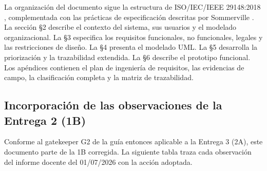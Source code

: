 \documentclass[11pt,a4paper]{article}
\begin{document}
La organización del documento sigue la estructura de ISO/IEC/IEEE 29148:2018 \cite{iso29148},
complementada con las prácticas de especificación descritas por Sommerville \cite{sommerville2016}.
La sección §2 describe el contexto del sistema, sus usuarios y el modelado organizacional. La §3
especifica los requisitos funcionales, no funcionales, legales y las restricciones de diseño. La §4
presenta el modelado UML. La §5 desarrolla la priorización y la trazabilidad extendida. La §6
describe el prototipo funcional. Los apéndices contienen el plan de ingeniería de requisitos, las
evidencias de campo, la clasificación completa y la matriz de trazabilidad.

\subsection{Incorporación de las observaciones de la Entrega 2 (1B)}

Conforme al gatekeeper G2 de la guía entonces aplicable a la Entrega 3 (2A), este documento parte de la 1B corregida. La
siguiente tabla traza cada observación del informe docente del 01/07/2026 con la acción adoptada.
\end{document}
